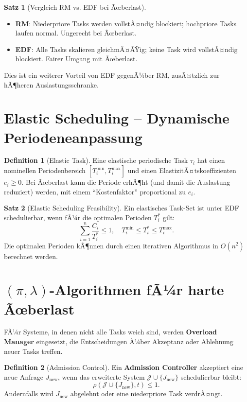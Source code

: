 ﻿\documentclass[a4paper,12pt]{report}
\theoremstyle{definition}
\newtheorem{definition}{Definition}[chapter]
\newtheorem{satz}{Satz}[chapter]
\begin{document}
\begin{satz}[Vergleich RM vs. EDF bei Ãœberlast]
	\begin{itemize}
		\item \textbf{RM}: Niederpriore Tasks werden vollstÃ¤ndig blockiert;
		      hochpriore Tasks laufen normal. Ungerecht bei Ãœberlast.
		\item \textbf{EDF}: Alle Tasks skalieren gleichmÃ¤ÃŸig; keine Task wird
		      vollstÃ¤ndig blockiert. Fairer Umgang mit Ãœberlast.
	\end{itemize}
	Dies ist ein weiterer Vorteil von EDF gegenÃ¼ber RM, zusÃ¤tzlich zur hÃ¶heren
	Auslastungsschranke.
\end{satz}

\section{Elastic Scheduling -- Dynamische Periodeneanpassung}

\begin{definition}[Elastic Task]
	Eine elastische periodische Task $\tau_i$ hat einen nominellen Periodenbereich
	$[T_i^{\min}, T_i^{\max}]$ und einen ElastizitÃ¤tskoeffizienten $e_i \geq 0$.
	Bei Ãœberlast kann die Periode erhÃ¶ht (und damit die Auslastung reduziert) werden,
	mit einem ``Kostenfaktor'' proportional zu $e_i$.
\end{definition}

\begin{satz}[Elastic Scheduling Feasibility]
	Ein elastisches Task-Set ist unter EDF schedulierbar, wenn fÃ¼r die optimalen
	Perioden $T_i^*$ gilt:
	\[
		\sum_{i=1}^n \frac{C_i}{T_i^*} \leq 1, \quad T_i^{\min} \leq T_i^* \leq T_i^{\max}.
	\]
	Die optimalen Perioden kÃ¶nnen durch einen iterativen Algorithmus in $O(n^2)$
	berechnet werden.
\end{satz}

\section{$(\pi, \lambda)$-Algorithmen fÃ¼r harte Ãœberlast}

FÃ¼r Systeme, in denen nicht alle Tasks weich sind, werden \textbf{Overload Manager}
eingesetzt, die Entscheidungen Ã¼ber Akzeptanz oder Ablehnung neuer Tasks treffen.

\begin{definition}[Admission Control]
	Ein \textbf{Admission Controller} akzeptiert eine neue Anfrage $J_{\text{new}}$,
	wenn das erweiterte System $\mathcal{J} \cup \{J_{\text{new}}\}$ schedulierbar
	bleibt:
	\[
		\rho(\mathcal{J} \cup \{J_{\text{new}}\}, t) \leq 1.
	\]
	Andernfalls wird $J_{\text{new}}$ abgelehnt oder eine niederpriore Task
	verdrÃ¤ngt.
\end{definition}
\end{document}
